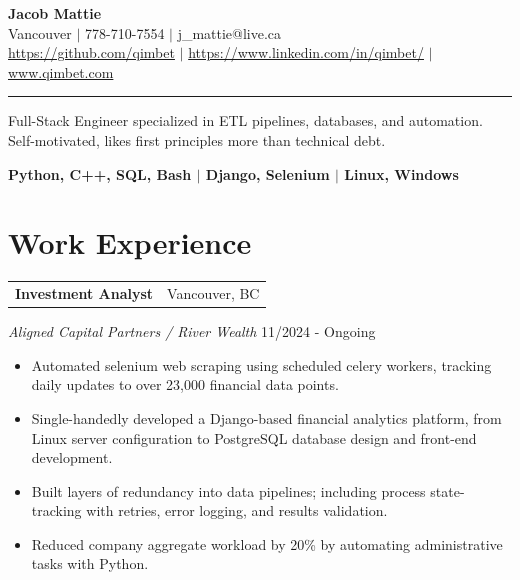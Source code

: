 \documentclass[a4paper,10pt]{article}
\makeatletter
\newcommand{\work}[5]{
	{
		\vspace{1.5mm}
		\noindent
		\begin{tabular*}{\textwidth}{@{\extracolsep{\fill}} l r}
			\textbf{#1} & #2 \\
		\end{tabular*}
		\vspace{-5mm}
		\textit{#3} \hfill #4 \\
		\begin{itemize}
			\setlength{\itemsep}{-1mm}
			\setlength{\topsep}{0mm}
			\setlength{\parsep}{0mm}
			#5
		\end{itemize}
	}
}
\makeatother
\begin{document}
	\begin{center}
		{\huge \bfseries Jacob Mattie} \\[0.75em]
		Vancouver $|$ 778-710-7554 $|$ j\_mattie@live.ca \\[0.15em]
		\href{https://github.com/qimbet}{https://github.com/qimbet} $|$ \href{https://www.linkedin.com/in/qimbet/}{https://www.linkedin.com/in/qimbet/}  $|$
		\href{www.qimbet.com}{www.qimbet.com}
		\\[0.15em]
		
		
	\end{center}
	
	\vspace{-1em}	
	\noindent\rule{\textwidth}{0.4pt}
	\vspace{-0.5em}
	
	\noindent
	Full-Stack Engineer specialized in ETL pipelines, databases, and automation. Self-motivated, likes first principles more than technical debt.
	
	\vspace{0em}
	
	\begin{center}
		\textbf{
			Python, C++, SQL, Bash \quad $|$ \quad Django, Selenium \quad $|$ \quad Linux, Windows
		}
		\\
		\vspace{1em}
		
		
	\end{center}
	
	
	
\section*{Work Experience}
	
	\work
	{Investment Analyst}
	{Vancouver, BC}
	{Aligned Capital Partners / River Wealth}
	{11/2024 - Ongoing}
	{
		\item Automated selenium web scraping using scheduled celery workers, tracking daily updates to over 23,000 financial data points.
		
		\item Single-handedly developed a Django-based financial analytics platform, from Linux server configuration to PostgreSQL database design and front-end development.
		
		\item Built layers of redundancy into data pipelines; including process state-tracking with retries, error logging, and results validation.
		
		\item Reduced company aggregate workload by 20\% by automating administrative tasks with Python.
	}
	
\end{document}

